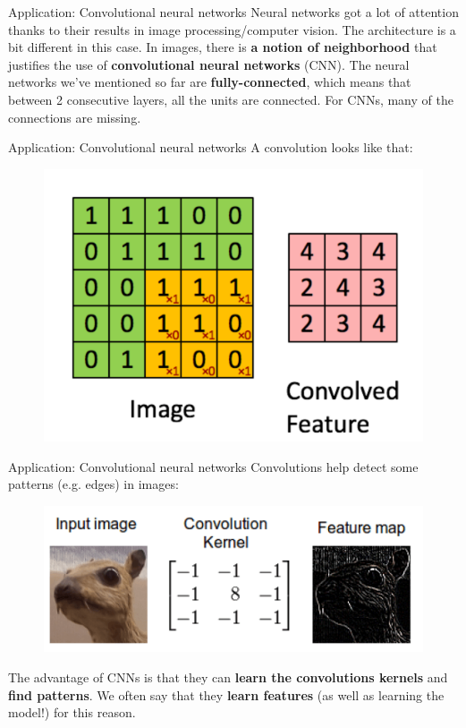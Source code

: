 \documentclass{beamer}
\newcommand{\1}[1]{\mathbbm{1}\left[#1\right]}
\newcommand{\pv}{\pause\vfill}
\begin{document}
\begin{frame}{Application: Convolutional neural networks}
Neural networks got a lot of attention thanks to their results in image processing/computer vision. 
\pv
The architecture is a bit different in this case. In images, there is \textbf{a notion of neighborhood} that justifies the use of \textbf{convolutional neural networks} (CNN).
\pv
The neural networks we've mentioned so far are \textbf{fully-connected}, which means that between 2 consecutive layers, all the units are connected. For CNNs, many of the connections are missing.
\end{frame}

\begin{frame}{Application: Convolutional neural networks}
A convolution looks like that:
\begin{figure}
\centering
\includegraphics[width=\textwidth]{images/convolution.png}
\end{figure}
\end{frame}

\begin{frame}{Application: Convolutional neural networks}
Convolutions help detect some patterns (e.g. edges) in images:
\pv
\begin{figure}
\centering
\includegraphics[width=\textwidth]{images/convolution_edge.png}
\end{figure}
\pv
The advantage of CNNs is that they can \textbf{learn the convolutions kernels} and \textbf{find patterns}. We often say that they \textbf{learn features} (as well as learning the model!) for this reason.
\end{frame}
\end{document}
